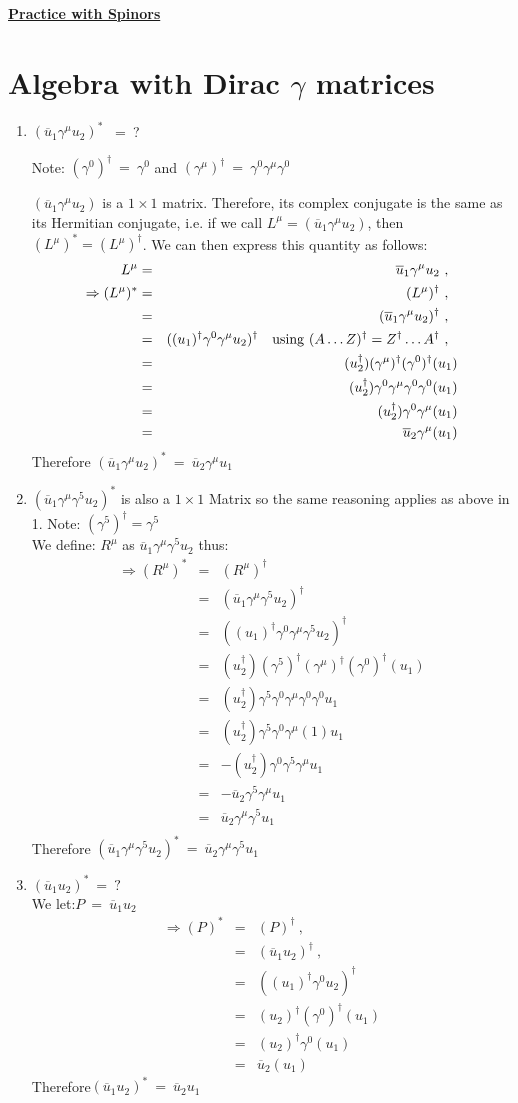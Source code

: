 \documentclass[12pt]{article}
\def \bea{\begin{eqnarray}}
\def \eea{\end{eqnarray}}
\def \nn{\nonumber}
\def \nl{\nn \\}
\def \ou{\overline{u}}
\def \ga{\gamma}
\begin{document}
\begin{center}
\underline{\textbf{\Large Practice with Spinors}}
\end{center}

\section{Algebra with Dirac $\ga$ matrices}

\begin{enumerate}

\item$(\ou_1\ga^\mu u_2)^*$ ~=~?

Note: $(\ga^0)^\dag~=~\ga^0$ and $(\ga^\mu)^\dag~=~ \ga^0\ga^\mu\ga^0$

$(\ou_1\ga^\mu u_2)$ is a $1\times1$ matrix. Therefore, its complex conjugate is the same as its Hermitian conjugate, i.e. if we call
$L^\mu = (\ou_1\ga^\mu u_2)$, then $(L^\mu)^* = (L^\mu)^\dag$. We can then express this quantity as follows:
\bea
L^\mu &=& \ou_1\ga^\mu u_2 ~,~~ \nonumber \\ \nonumber
\Rightarrow (L^\mu)^* &=& (L^\mu)^\dag ~,~~ \nl
&=& (\ou_1\ga^\mu u_2)^\dag ~,~~ \nl
&=& ((u_1)^\dag\ga^0\ga^\mu u_2)^\dag ~~~{\rm using}~(A\ldots Z)^\dag = Z^\dag\ldots A^\dag ~,~~ \nl
&=& (u_2^\dag)(\ga^\mu)^\dag(\ga^0)^\dag(u_1)\nl
&=& (u_2^\dag)\ga^0\ga^\mu\ga^0\ga^0(u_1)\nl
&=& (u_2^\dag)\ga^0\ga^\mu(u_1)\nl
&=& \ou_2\ga^\mu(u_1) \nonumber
\eea \nonumber
Therefore $(\ou_1\ga^\mu u_2)^*~=~\ou_2\ga^\mu u_1 $
%
\item $(\ou_1\ga^\mu \ga^5 u_2)^*$ is also a $1\times1$ Matrix so the same reasoning applies as above in 1. Note: $(\ga^5)^\dag = \ga^5$\nl
We define: $R^\mu$ as $\ou_1\ga^\mu\ga^5 u_2$ thus:
\bea
\Rightarrow (R^\mu)^* &=& (R^\mu)^\dag \nl
&=&(\ou_1\ga^\mu\ga^5 u_2)^\dag  \nl
&=& ((u_1)^\dag\ga^0\ga^\mu\ga^5 u_2)^\dag \nl
&=& (u_2^\dag)(\ga^5)^\dag(\ga^\mu)^\dag(\ga^0)^\dag(u_1)\nl
&=& (u_2^\dag)\ga^5\ga^0\ga^\mu\ga^0\ga^0 u_1\nl
&=& (u_2^\dag)\ga^5\ga^0\ga^\mu(1) u_1\nl
&=& -(u_2^\dag)\ga^0\ga^5\ga^\mu u_1\nl
&=& -\ou_2\ga^5\ga^\mu u_1\nl
&=& \ou_2\ga^\mu\ga^5 u_1\nl\nonumber
\eea \nonumber
%
Therefore $(\ou_1\ga^\mu \ga^5 u_2)^*~=~\ou_2 \ga^\mu \ga^5 u_1$
\item $ (\ou_1 u_2)^* ~=~ ?$ \nl
We let:$P ~=~ \ou_1 u_2$
\bea
\Rightarrow (P)^* &=& (P)^\dag ~,~~ \nl
&=& (\ou_1 u_2)^\dag ~,~~ \nl
&=& ((u_1)^\dag\ga^0 u_2)^\dag \nl
&=& (u_2)^\dag(\ga^0)^\dag(u_1)\nl
&=& (u_2)^\dag\ga^0(u_1)\nl
&=& \ou_2(u_1) \nonumber
\eea \nonumber
%
Therefore$(\ou_1 u_2)^* ~=~ \ou_2 u_1$


\end{enumerate}
\end{document}

